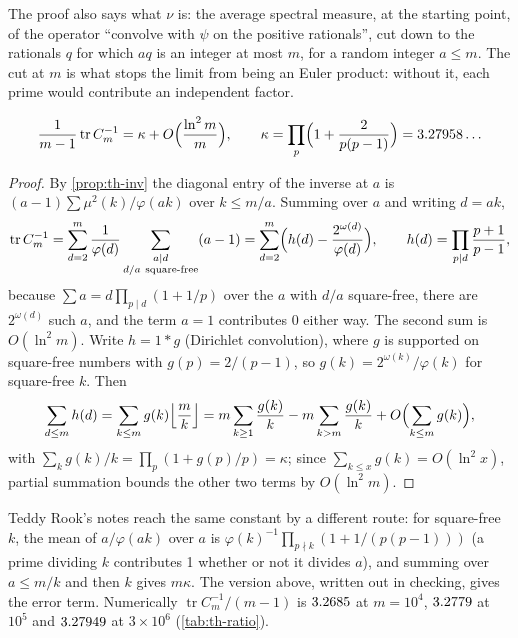 The proof also says what $\nu$ is: the average spectral measure, at the starting point, of the operator ``convolve with $\psi$ on the positive rationals'', cut down to the rationals $q$ for which $aq$ is an integer at most $m$, for a random integer $a \le m$. The cut at $m$ is what stops the limit from being an Euler product: without it, each prime would contribute an independent factor.

\begin{proposition}\label{prop:th-trace}
\[
  \frac{1}{m-1}\operatorname{tr}C_m^{-1} = \kappa + O\Bigl(\frac{\ln^2m}{m}\Bigr), \qquad \kappa = \prod_p\Bigl(1 + \frac{2}{p(p-1)}\Bigr) = 3.27958\ldots
\]
\end{proposition}

\begin{proof}
By \cref{prop:th-inv} the diagonal entry of the inverse at $a$ is $(a-1)\sum\mu^2(k)/\varphi(ak)$ over $k \le m/a$. Summing over $a$ and writing $d = ak$,
\[
  \operatorname{tr}C_m^{-1} = \sum_{d=2}^{m}\frac{1}{\varphi(d)}\sum_{\substack{a \mid d\\ d/a\ \text{square-free}}}(a - 1) = \sum_{d=2}^{m}\Bigl(h(d) - \frac{2^{\omega(d)}}{\varphi(d)}\Bigr), \qquad h(d) = \prod_{p \mid d}\frac{p+1}{p-1},
\]
because $\sum a = d\prod_{p\mid d}(1 + 1/p)$ over the $a$ with $d/a$ square-free, there are $2^{\omega(d)}$ such $a$, and the term $a = 1$ contributes $0$ either way. The second sum is $O(\ln^2m)$. Write $h = 1 * g$ (Dirichlet convolution), where $g$ is supported on square-free numbers with $g(p) = 2/(p-1)$, so $g(k) = 2^{\omega(k)}/\varphi(k)$ for square-free $k$. Then
\[
  \sum_{d \le m}h(d) = \sum_{k \le m}g(k)\Bigl\lfloor\frac mk\Bigr\rfloor = m\sum_{k \ge 1}\frac{g(k)}{k} - m\sum_{k > m}\frac{g(k)}{k} + O\Bigl(\sum_{k\le m}g(k)\Bigr),
\]
with $\sum_k g(k)/k = \prod_p(1 + g(p)/p) = \kappa$; since $\sum_{k \le x}g(k) = O(\ln^2x)$, partial summation bounds the other two terms by $O(\ln^2m)$.
\end{proof}

Teddy Rook's notes reach the same constant by a different route: for square-free $k$, the mean of $a/\varphi(ak)$ over $a$ is $\varphi(k)^{-1}\prod_{p \nmid k}(1 + 1/(p(p-1)))$ (a prime dividing $k$ contributes 1 whether or not it divides $a$), and summing over $a \le m/k$ and then $k$ gives $m\kappa$. The version above, written out in checking, gives the error term. Numerically $\operatorname{tr}C_m^{-1}/(m-1)$ is $3.2685$ at $m = 10^4$, $3.2779$ at $10^5$ and $3.27949$ at $3\times10^6$ (\cref{tab:th-ratio}).

